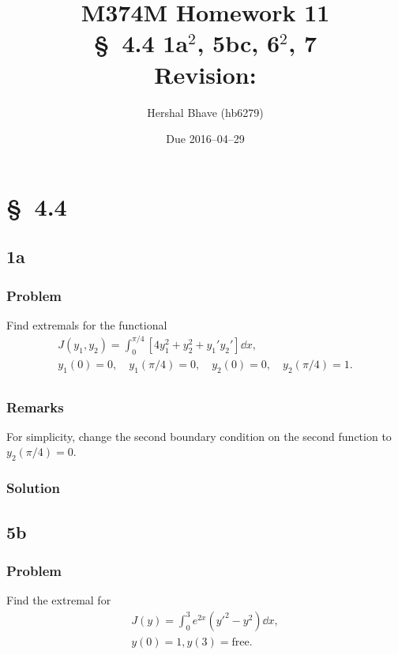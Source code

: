 \documentclass[12pt,twoside]{article}
\title{M374M Homework 11 \\
  \normalsize{\S~4.4 1a$^2$, 5bc, 6$^2$, 7} \\
  Revision: }
\author{Hershal Bhave (hb6279)}
\date{Due 2016--04--29}
\begin{document}
\maketitle

\section{\S~4.4}
\subsection{1a}
\subsubsection*{Problem}
Find extremals for the functional
\begin{equation}
  \label{eq:1a-problem}
  \begin{aligned}
    J(y_1, y_2)=\int_0^{\pi/4}[4y_1^2+y_2^2+y_1'y_2']\dd{x}, \\
    y_1(0)=0, \quad y_1(\pi/4)=0,\quad y_2(0)=0,\quad y_2(\pi/4)=1. \\
  \end{aligned}
\end{equation}

\subsubsection*{Remarks}
For simplicity, change the second boundary condition on the second function to
$y_2(\pi/4)=0$.

\subsubsection*{Solution}
\todo{}

\subsection{5b}
\subsubsection*{Problem}
Find the extremal for
\begin{equation}
  \label{eq:5a-problem}
  \begin{aligned}
    J(y) = \int_0^3 e^{2x}(y'^2-y^2)\dd{x}, \\
    y(0)=1, y(3)=\text{free}. \\
  \end{aligned}
\end{equation}
\end{document}
